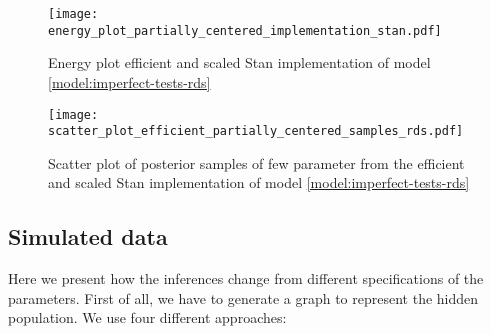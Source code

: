 \begin{figure}[htb]
  \centering
  \caption{\label{fig:energy_plot_partially_centered_implementation_stan}Energy plot
    efficient and scaled Stan implementation of model \eqref{model:imperfect-tests-rds}}
  \texttt{[image: energy\_plot\_partially\_centered\_implementation\_stan.pdf]}
\end{figure}

\begin{figure}[htb]
  \centering
  \caption{\label{fig:scatter_plot_efficient_partially_centered_samples_rds}Scatter plot
    of posterior samples of few parameter from the efficient and scaled Stan implementation of model
    \eqref{model:imperfect-tests-rds}}
  \texttt{[image: scatter\_plot\_efficient\_partially\_centered\_samples\_rds.pdf]}
\end{figure}

\subsection{Simulated data}
\label{sec:simulated-data-rds-imperfect-tests}

Here we present how the inferences change from different specifications of the
parameters. First of all, we have to generate a graph to represent
the hidden population. We use four different approaches:

